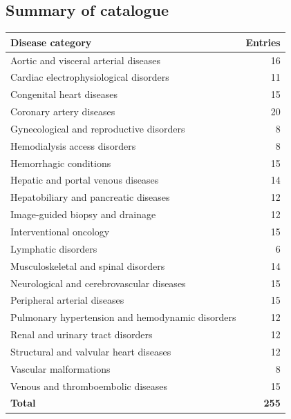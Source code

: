 \subsection{Summary of catalogue}
\begin{center}
\begin{tabular}{@{}p{}r@{}}
\toprule
\textbf{Disease category} & \textbf{Entries} \\
\midrule
Aortic and visceral arterial diseases & 16 \\
Cardiac electrophysiological disorders & 11 \\
Congenital heart diseases & 15 \\
Coronary artery diseases & 20 \\
Gynecological and reproductive disorders & 8 \\
Hemodialysis access disorders & 8 \\
Hemorrhagic conditions & 15 \\
Hepatic and portal venous diseases & 14 \\
Hepatobiliary and pancreatic diseases & 12 \\
Image-guided biopsy and drainage & 12 \\
Interventional oncology & 15 \\
Lymphatic disorders & 6 \\
Musculoskeletal and spinal disorders & 14 \\
Neurological and cerebrovascular diseases & 15 \\
Peripheral arterial diseases & 15 \\
Pulmonary hypertension and hemodynamic disorders & 12 \\
Renal and urinary tract disorders & 12 \\
Structural and valvular heart diseases & 12 \\
Vascular malformations & 8 \\
Venous and thromboembolic diseases & 15 \\
\midrule
\textbf{Total} & \textbf{255} \\
\bottomrule
\end{tabular}
\end{center}

